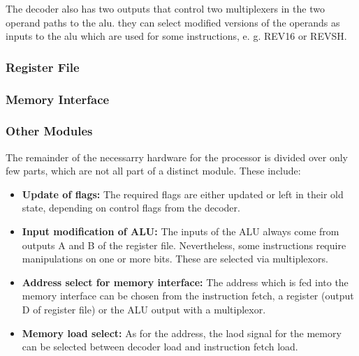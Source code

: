 The decoder also has two outputs that control two multiplexers in the two operand paths to the alu. they can select modified versions of the operands as inputs to the alu which are used for some instructions, e. g. REV16 or REVSH.

\subsubsection{Register File}
\label{subsubsec:regfisterfile}

\subsubsection{Memory Interface}
\label{subsubsec:memoryinterface}

\subsubsection{Other Modules}
\label{subsubsec:othermodules}

The remainder of the necessarry hardware for the processor is divided over only few parts, which are not all part of a distinct module. These include:
\begin{itemize}
\item \textbf{Update of flags: }The required flags are either updated or left in their old state, depending on control flags from the decoder.
\item \textbf{Input modification of ALU:} The inputs of the ALU always come from outputs A and B of the register file. Nevertheless, some instructions require manipulations on one or more bits. These are selected via multiplexors.
\item \textbf{Address select for memory interface:} The address which is fed into the memory interface can be chosen from the instruction fetch, a register (output D of register file) or the ALU output with a multiplexor.
\item \textbf{Memory load select:} As for the address, the laod signal for the memory can be selected between decoder load and instruction fetch load.
\end{itemize}

